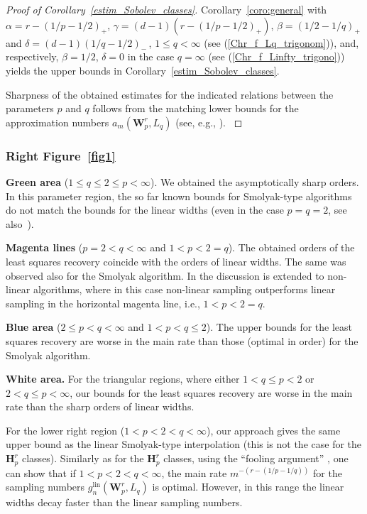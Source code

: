 \documentclass[a4paper,12pt]{amsart}
\theoremstyle{definition}
\theoremstyle{remark}
\newcommand{\lin}{\ensuremath{\mathrm{lin}}}
\begin{document}
{\begin{proof}[Proof of Corollary~\ref{estim_Sobolev_classes}]
{Corollary~\ref{coro:general}}
with 
$\alpha  = r-(1/p-1/2)_+$, 
$\gamma =(d-1)(r-(1/p-1/2)_+)$, 
$\beta = (1/2-1/q)_+$ and $\delta =(d-1)(1/q-1/2)_-$\,, 
$1\leq q <\infty$ (see (\ref{Chr_f_Lq_trigonom})), and, respectively, 
$\beta = 1/2$, $\delta =0$ in the case $q=\infty$ (see (\ref{Chr_f_Linfty_trigono}))
 yields the 
  {upper bounds in}
  Corollary~\ref{estim_Sobolev_classes}.

 
 {Sharpness of the obtained estimates for the indicated  relations between the parameters $p$ and $q$ follows from the matching lower bounds for the approximation numbers 
$a_m(\mathbf{W}^r_p, L_q)$ (see, e.g., \cite[Thm. 4.5.1]{DTU18}).
}
\end{proof}

\subsubsection*{Right Figure~\ref{fig1}}
{\medskip
{\bf Green area} ($1\leq q \leq 2\leq p
<\infty$).  We obtained the asymptotically sharp orders. In this parameter region,
the so far known bounds for Smolyak-type algorithms do not match the bounds for the linear widths (even in the case $p=q=2$, see also~\cite{DKU}). 

{\bf Magenta lines} ($p=2<q<\infty$ and $1 < p < 2 = q$).  The obtained orders of the least squares recovery coincide with
the orders of linear widths. The same was observed also for the Smolyak algorithm. In \cite{MPU25} the discussion is extended to non-linear algorithms, where in this case non-linear sampling outperforms linear sampling in the horizontal magenta line, i.e., $1<p<2=q$.

{\bf Blue area} ($2\leq p<q < \infty$ and $1<p<q\leq 2$). The upper bounds for the least squares recovery are worse in the main rate than those (optimal in order) for the Smolyak algorithm.

{\bf White area.} For the triangular regions, where either $1<q\leq p <2$ or $2<q\leq p < \infty$,  our bounds for the least squares recovery are worse in the main rate than the sharp orders of linear widths. 

For the lower right region ($1<p<2<q<\infty$),  our approach gives the same upper bound  as the linear Smolyak-type interpolation \cite[Cor.\,7.1]{Byrenheid_Ullrich2017} 
(this is not the case for the $\mathbf{H}^r_p$ classes).  
Similarly as for the $\mathbf{H}^r_p$ classes, using the ``fooling argument'' \cite[Cor.\,8.6]{Byrenheid_Ullrich2017}, one can show that if $1<p<2< q<\infty$, the
main rate $m^{-(r-(1/p-1/q))}$ for the sampling numbers $g_n^{\lin}(\mathbf{W}^r_p, L_q)$ is optimal. 
However, in this range the linear widths 
{decay faster} %
than the linear sampling numbers.


}}
\end{document}
